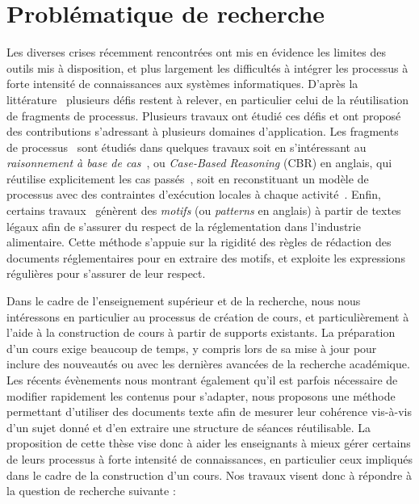 

\section{Problématique de recherche}
\label{section:Introduction:ProblematiqueRecherche}

Les diverses crises récemment rencontrées ont mis en évidence les limites des outils mis à disposition, et plus largement les difficultés à intégrer les processus à forte intensité de connaissances aux systèmes informatiques.
D'après la littérature~\cite{boissier2019challenges} plusieurs défis restent à relever, en particulier celui de la réutilisation de fragments de processus.
Plusieurs travaux ont étudié ces défis et ont proposé des contributions s'adressant à plusieurs domaines d'application.
Les fragments de processus~\cite{eberle2009process}\cite{eberle2010process} sont étudiés dans quelques travaux soit en s'intéressant au \textit{raisonnement à base de cas}~\cite{slade1991case}, ou \textit{Case-Based Reasoning} (CBR) en anglais, qui réutilise explicitement les cas passés~\cite{cognini2016case}, soit en reconstituant un modèle de processus avec des contraintes d'exécution locales à chaque activité~\cite{di2013mining}.
Enfin, certains travaux~\cite{zasada2018box} génèrent des \textit{motifs} (ou \textit{patterns} en anglais) à partir de textes légaux afin de s'assurer du respect de la réglementation dans l'industrie alimentaire.
Cette méthode s'appuie sur la rigidité des règles de rédaction des documents réglementaires pour en extraire des motifs, et exploite les expressions régulières pour s'assurer de leur respect.

\bigskip

Dans le cadre de l'enseignement supérieur et de la recherche, nous nous intéressons en particulier au processus de création de cours, et particulièrement à l'aide à la construction de cours à partir de supports existants.
La préparation d'un cours exige beaucoup de temps, y compris lors de sa mise à jour pour inclure des nouveautés ou avec les dernières avancées de la recherche académique.
Les récents évènements nous montrant également qu'il est parfois nécessaire de modifier rapidement les contenus pour s'adapter, nous proposons une méthode permettant d'utiliser des documents texte afin de mesurer leur cohérence vis-à-vis d'un sujet donné et d'en extraire une structure de séances réutilisable.
La proposition de cette thèse vise donc à aider les enseignants à mieux gérer certains de leurs processus à forte intensité de connaissances, en particulier ceux impliqués dans le cadre de la construction d'un cours.
Nos travaux visent donc à répondre à la question de recherche suivante :

